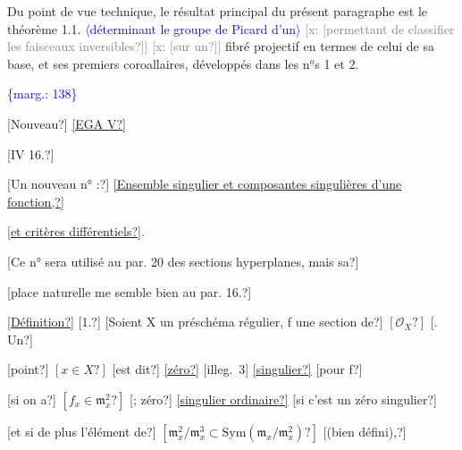 \documentclass[11pt]{article}
\newcommand{\scanpage}[1]{\par\bigskip\noindent{\small\sffamily[scan #1]}\par}
\newcommand{\mspage}[1]{{\small\sffamily[p.\,#1]}}
\newcommand{\hand}[1]{\textcolor{blue}{#1}}
\newcommand{\inserted}[2][]{\textcolor{blue}{$\langle$#2$\rangle$}}
\newcommand{\margin}[1]{\textcolor{blue}{\{\textsf{marg.:} #1\}}}
\newcommand{\xout}[1]{\textcolor{gray}{[\textsf{x:} #1]}}
\newcommand{\uline}[1]{\underline{#1}}
\newcommand{\unsure}[1]{[#1?]}
\newcommand{\illegible}[1]{[\textsf{illeg.\ #1}]}
\begin{document}
\mspage{\hand{137}}

\clearpage
\scanpage{25/138}
\mspage{\hand{41}}

Du point de  vue technique, le résultat principal du présent paragraphe
est le théorème 1.1. \inserted[typed]{déterminant le groupe de Picard d'un} \xout{\unsure{permettant de classifier les faisceaux inversibles}}
\xout{\unsure{sur un}} fibré projectif  en termes de celui de sa base, et ses premiers
coroallaires, développés dans les n$^{\underline{o}}$s 1 et 2.

\margin{138}

\clearpage
\scanpage{25/139}
\unsure{Nouveau} \uline{\unsure{EGA V}}

\unsure{IV 16.}

\unsure{Un nouveau n° :} \uline{\unsure{Ensemble singulier et composantes singulières d'une fonction,}}

\uline{\unsure{et critères différentiels}}.

\unsure{Ce n° sera utilisé au par. 20 des sections hyperplanes, mais sa}

\unsure{place naturelle me semble bien au par. 16.}

\uline{\unsure{Définition}} \unsure{1.} \unsure{Soient X un préschéma régulier, f une section de} $\unsure{\mathcal{O}_X}$ \unsure{. Un}

\unsure{point} $\unsure{x\in X}$ \unsure{est dit} \uline{\unsure{zéro}} \illegible{3} \uline{\unsure{singulier}} \unsure{pour f}

\unsure{si on a} $\unsure{f_x \in \mathfrak{m}_x^2}$ \unsure{; zéro} \uline{\unsure{singulier ordinaire}} \unsure{si c'est un zéro singulier}

\unsure{et si de plus l'élément de} $\unsure{\mathfrak{m}_x^2/\mathfrak{m}_x^3 \subset \mathrm{Sym}(\mathfrak{m}_x/\mathfrak{m}_x^2)}$ \unsure{(bien défini),}
\end{document}
